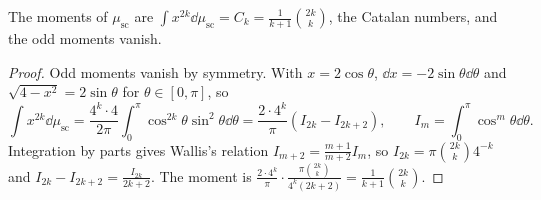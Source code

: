 \begin{lemma}\label{moments:lem:scmoments}
The moments of $\mu_{\mathrm{sc}}$ are $\int x^{2k}\dd\mu_{\mathrm{sc}}=C_k=\frac1{k+1}\binom{2k}k$, the Catalan numbers, and the odd moments vanish.
\end{lemma}
\begin{proof}
Odd moments vanish by symmetry. With $x=2\cos\theta$, $\dd x=-2\sin\theta\dd\theta$ and $\sqrt{4-x^2}=2\sin\theta$ for $\theta\in[0,\pi]$, so
\[
\int x^{2k}\dd\mu_{\mathrm{sc}}=\frac{4^k\cdot4}{2\pi}\int_0^\pi\cos^{2k}\theta\sin^2\theta\dd\theta=\frac{2\cdot4^k}\pi(I_{2k}-I_{2k+2}),\qquad I_m=\int_0^\pi\cos^m\theta\dd\theta.
\]
Integration by parts gives Wallis's relation $I_{m+2}=\frac{m+1}{m+2}I_m$, so $I_{2k}=\pi\binom{2k}k4^{-k}$ and $I_{2k}-I_{2k+2}=\frac{I_{2k}}{2k+2}$. The moment is
$\frac{2\cdot4^k}\pi\cdot\frac{\pi\binom{2k}k}{4^k(2k+2)}=\frac1{k+1}\binom{2k}k$.
\end{proof}


